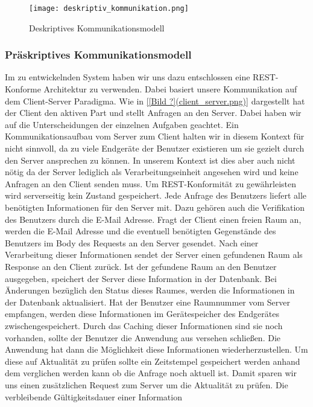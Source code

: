 \begin{figure}
	\centering
	\texttt{[image: deskriptiv\_kommunikation.png]}
	\caption{ Deskriptives Kommunikationsmodell}
\end{figure}

\subsubsection{Präskriptives Kommunikationsmodell}
\label{sec:Präskriptives Kommunikationsmodell}

Im zu entwickelnden System haben wir uns dazu entschlossen eine REST-Konforme
Architektur zu verwenden.
Dabei basiert unsere Kommunikation auf dem Client-Server Paradigma. Wie in 
\ref{[Bild ?](client_server.png)} dargestellt hat der Client den aktiven 
Part und stellt Anfragen an den Server.
Dabei haben wir auf die Unterscheidungen der einzelnen Aufgaben geachtet.
Ein Kommunikationsaufbau vom Server zum Client halten wir in diesem Kontext für
nicht sinnvoll, da zu viele Endgeräte der Benutzer existieren um sie gezielt
durch den Server ansprechen zu können. In unserem Kontext ist dies aber auch
nicht nötig da der Server lediglich als Verarbeitungseinheit angesehen wird und
keine Anfragen an den Client senden muss.
Um REST-Konformität zu gewährleisten wird serverseitig kein Zustand gespeichert.
Jede Anfrage des Benutzers liefert alle benötigten Informationen für den Server
mit. Dazu gehören auch die Verifikation des Benutzers durch die E-Mail Adresse.
Fragt der Client einen freien Raum an, werden die E-Mail Adresse und die
eventuell benötigten Gegenstände des Benutzers im Body des Requests an den
Server gesendet. Nach einer Verarbeitung dieser Informationen sendet der Server
einen gefundenen Raum als Response an den Client zurück. Ist der gefundene Raum
an den Benutzer ausgegeben, speichert der Server diese Information in der
Datenbank. Bei Änderungen bezüglich den Status dieses Raumes, werden die
Informationen in der Datenbank aktualisiert.
Hat der Benutzer eine Raumnummer vom Server empfangen, werden diese
Informationen im Gerätespeicher des Endgerätes zwischengespeichert. Durch das
Caching dieser Informationen sind sie noch vorhanden, sollte der Benutzer die
Anwendung aus versehen schließen. Die Anwendung hat dann die Möglichkeit diese
Informationen wiederherzustellen. Um diese auf Aktualität zu prüfen sollte ein
Zeitstempel gespeichert werden anhand dem verglichen werden kann ob die Anfrage
noch aktuell ist. Damit sparen wir uns einen zusätzlichen Request zum Server um
die Aktualität zu prüfen. Die verbleibende Gültigkeitsdauer einer Information
